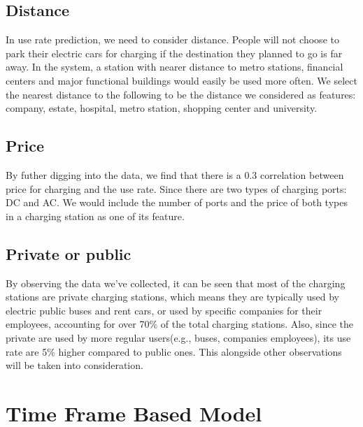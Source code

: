 \documentclass[conference]{IEEEtran}
\begin{document}
\subsection{Distance}

In use rate prediction, we need to consider distance. People will not choose to park their electric cars for charging if the destination they planned to go is far away. In the system, a station with nearer distance to metro stations, financial centers and major functional buildings would easily be used more often. We select the nearest distance to the following to be the distance we considered as features: company, estate, hospital, metro station, shopping center and university.

\subsection{Price}
By futher digging into the data, we find that there is a 0.3 correlation between price for charging and the use rate. Since there are two types of charging ports: DC and AC. We would include the number of ports and the price of both types in a charging station as one of its feature.

\subsection{Private or public}
By observing the data we've collected, it can be seen that most of the charging stations are private charging stations, which means they are typically used by electric public buses and rent cars, or used by specific companies for their employees, accounting for over 70\% of the total charging stations. Also, since the private are used by more regular users(e.g., buses, companies employees), its use rate are 5\% higher compared to public ones. This alongside other observations will be taken into consideration.

\section{Time Frame Based Model}
\end{document}
